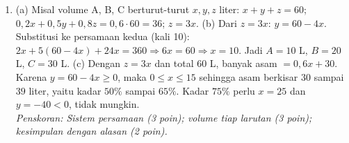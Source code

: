 \documentclass[a4paper,11pt]{article}
\newcounter{no}
\begin{document}
\begin{enumerate}[leftmargin=2em,itemsep=3pt,topsep=2pt]
\begin{center}
\end{center}\vspace{-0.4em}
\item[\textbf{5.}] (a) Misal volume A, B, C berturut-turut $x,y,z$ liter: $x+y+z=60$; $0{,}2x+0{,}5y+0{,}8z=0{,}6\cdot60=36$; $z=3x$. (b) Dari $z=3x$: $y=60-4x$. Substitusi ke persamaan kedua (kali 10): $2x+5(60-4x)+24x=360\Rightarrow6x=60\Rightarrow x=10$. Jadi $A=10$ L, $B=20$ L, $C=30$ L. (c) Dengan $z=3x$ dan total $60$ L, banyak asam $=0{,}6x+30$. Karena $y=60-4x\ge0$, maka $0\le x\le15$ sehingga asam berkisar $30$ sampai $39$ liter, yaitu kadar $50\%$ sampai $65\%$. Kadar $75\%$ perlu $x=25$ dan $y=-40<0$, tidak mungkin. \\ \textit{Penskoran: Sistem persamaan (3 poin); volume tiap larutan (3 poin); kesimpulan dengan alasan (2 poin).}
\end{enumerate}
\end{document}
